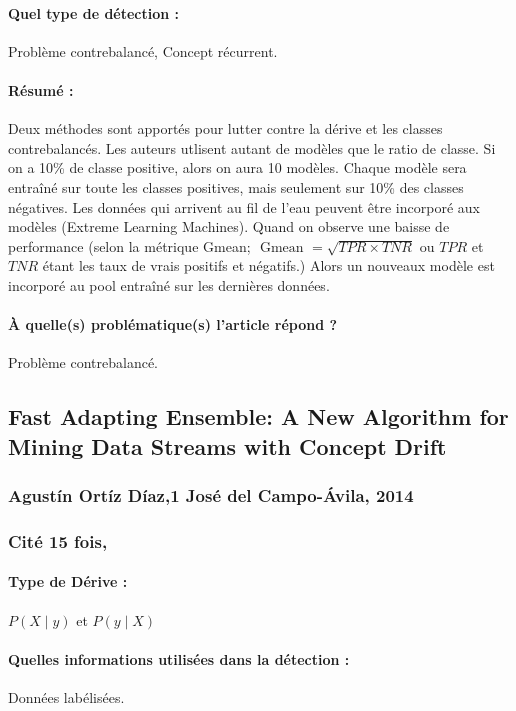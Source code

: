 \documentclass[11pt,a4paper]{report}
\begin{document}
\paragraph{Quel type de détection :} Problème contrebalancé, Concept récurrent.

\paragraph{Résumé :} Deux méthodes sont apportés pour lutter contre la dérive et les classes contrebalancés. Les auteurs utlisent autant de modèles que le ratio de classe. Si on a 10\% de classe positive, alors on aura 10 modèles. Chaque modèle sera entraîné sur toute les classes positives, mais seulement sur 10\% des classes négatives. 
Les données qui arrivent au fil de l'eau peuvent être incorporé aux modèles (Extreme Learning Machines). Quand on observe une baisse de performance (selon la métrique Gmean; $\text { Gmean }=\sqrt{T P R \times T N R}$ ou $TPR$ et $TNR$ étant les taux de vrais positifs et négatifs.) Alors un nouveaux modèle est incorporé au pool entraîné sur les dernières données.


\paragraph{À quelle(s) problématique(s) l'article répond ?} Problème contrebalancé.








\subsection{Fast Adapting Ensemble: A New Algorithm for Mining Data Streams with Concept Drift}
\subsubsection{Agustín Ortíz Díaz,1 José del Campo-Ávila,  2014}

\subsubsection{Cité 15 fois, }

\paragraph{Type de Dérive :} $P(X\mid y)$ et $P(y \mid X)$ 
\paragraph{Quelles informations utilisées dans la détection :} Données labélisées.
\end{document}
